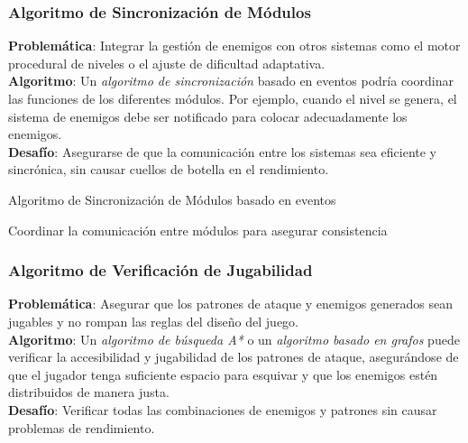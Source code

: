 \subsubsection*{Algoritmo de Sincronización de Módulos}
\textbf{Problemática}: Integrar la gestión de enemigos con otros sistemas como el motor procedural de niveles o el ajuste de dificultad adaptativa.\\
\textbf{Algoritmo}: Un \textit{algoritmo de sincronización} basado en eventos podría coordinar las funciones de los diferentes módulos. Por ejemplo, cuando el nivel se genera, el sistema de enemigos debe ser notificado para colocar adecuadamente los enemigos.\\
\textbf{Desafío}: Asegurarse de que la comunicación entre los sistemas sea eficiente y sincrónica, sin causar cuellos de botella en el rendimiento.

\begin{algorithm}[H]
\caption{Algoritmo de Sincronización de Módulos basado en eventos}
\SetAlgoLined



Coordinar la comunicación entre módulos para asegurar consistencia\;

\end{algorithm}


\subsubsection*{Algoritmo de Verificación de Jugabilidad}
\textbf{Problemática}: Asegurar que los patrones de ataque y enemigos generados sean jugables y no rompan las reglas del diseño del juego.\\
\textbf{Algoritmo}: Un \textit{algoritmo de búsqueda A*} o un \textit{algoritmo basado en grafos} puede verificar la accesibilidad y jugabilidad de los patrones de ataque, asegurándose de que el jugador tenga suficiente espacio para esquivar y que los enemigos estén distribuidos de manera justa.\\
\textbf{Desafío}: Verificar todas las combinaciones de enemigos y patrones sin causar problemas de rendimiento.
